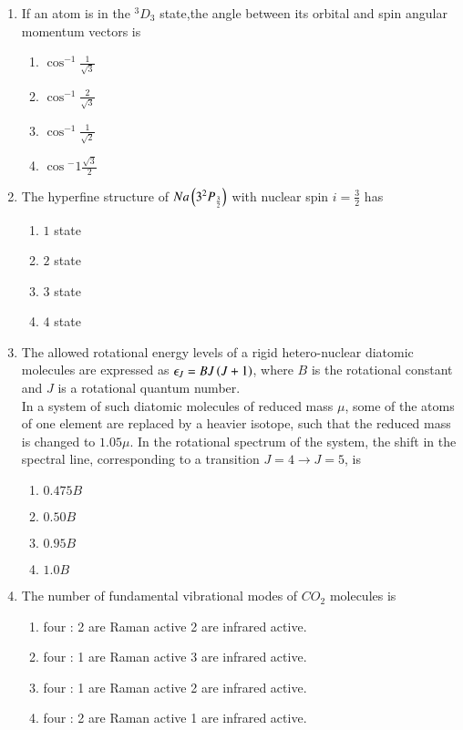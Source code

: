 \documentclass[journal]{IEEEtran}
\begin{document}
\begin{enumerate}
\begin{enumerate}
\end{enumerate}
\item If an atom is in the ${}^3D_3$ state,the angle between its orbital and spin angular momentum vectors  is 
\begin{enumerate}
    \item $\cos^{-1}{\frac{1}{\sqrt{3}}}$
     \item $\cos^{-1}\frac{2}{\sqrt{3}}$
      \item $\cos^{-1}\frac{1}{\sqrt{2}}$
       \item $\cos{^-1}\frac{\sqrt{3}}{2}$
\end{enumerate}
\item The hyperfine structure of $Na\left(3^2P_{\frac{3}{2}}\right)$ with nuclear spin $i=\frac{3}{2}$ has
\begin{enumerate}
    \item $1$ state
    \item $2$ state
    \item $3$ state
    \item $4$ state
\end{enumerate}
\item The allowed rotational energy levels of a rigid hetero-nuclear diatomic molecules are expressed as $\epsilon_J=BJ\left(J+1\right)$, where $B$ is the rotational constant and $J$ is a rotational quantum number.\\
In a system of such diatomic molecules of reduced mass $\mu$, some of the atoms of one element are replaced by a heavier isotope, such that the reduced mass is changed to $1.05\mu$. In the rotational spectrum of the system, the shift in the spectral line, corresponding to a transition $J=4\xrightarrow{}J=5$, is


\begin{enumerate}
    \item $0.475B$
    \item $0.50 B$
    \item $0.95 B$
    \item $1.0 B$
    
\end{enumerate}
\item The number of fundamental vibrational modes of $CO_2$ molecules is 
\begin{enumerate}
    \item four : 2 are Raman active 2 are infrared active.
     \item four : 1 are Raman active 3 are infrared active.
      \item four : 1 are Raman active 2 are infrared active.
       \item four : 2 are Raman active 1 are infrared active.
    

\end{enumerate}
\end{enumerate}
\end{document}
